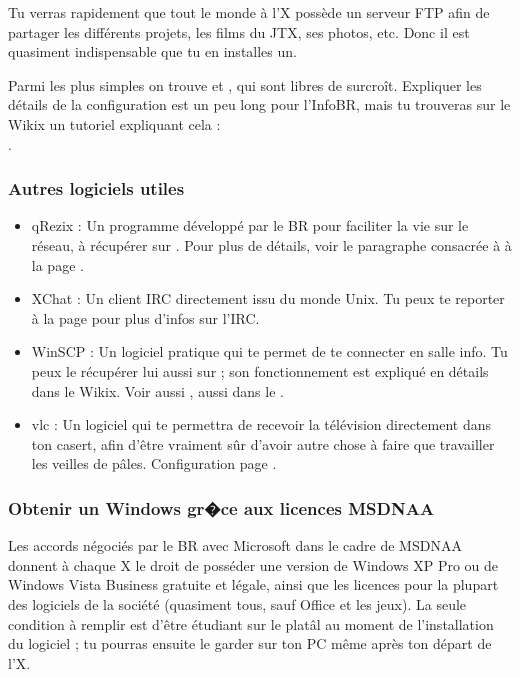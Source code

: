 Tu verras rapidement que tout le monde \`a l'X poss\`ede un serveur FTP
afin de partager les diff\'erents projets, les films du JTX, ses
photos, etc. Donc il est quasiment indispensable que tu en installes
un.

Parmi les plus simples on trouve  et , qui sont libres de surcro\^{i}t. Expliquer les d\'etails de la configuration est un peu long pour l'InfoBR, mais tu trouveras sur le Wikix un tutoriel expliquant cela : \\
.

\subsubsection{Autres logiciels utiles}

\begin{itemize}
  \item qRezix : Un programme d\'evelopp\'e par le BR pour faciliter la vie sur le r\'eseau,
                  \`a r\'ecup\'erer sur \xshare. Pour plus de d\'etails, voir le paragraphe consacr\'ee
                  \`a  \`a la page \pageref{qrezix}.
  \item XChat : Un client IRC directement issu du monde Unix.
                 Tu peux te reporter \`a la page \pageref{irc} pour plus d'infos sur l'IRC.
  \item WinSCP : Un logiciel pratique qui te permet de te connecter en salle info.
                  Tu peux le r\'ecup\'erer lui aussi sur \xshare ;
                  son fonctionnement est expliqu\'e en d\'etails dans le Wikix. Voir aussi , aussi dans le \xshare.
  \item vlc : Un logiciel qui te permettra de recevoir la t\'el\'evision directement dans ton casert, afin d'\^etre vraiment s\^{u}r d'avoir autre chose \`a faire que travailler les veilles de p\^ales. Configuration page \pageref{TV}.
\end{itemize}


\subsubsection{Obtenir un Windows gr�ce aux licences MSDNAA}

\label{msdnaa} Les accords n\'egoci\'es par le BR avec Microsoft dans le cadre de MSDNAA donnent \`a chaque X le droit de poss\'eder une version de Windows
XP Pro ou de Windows Vista Business gratuite et l\'egale, ainsi que les licences pour la plupart des logiciels de la soci\'et\'e (quasiment tous, sauf
Office et les jeux). La seule condition \`a remplir est d'\^etre \'etudiant sur le plat\^{a}l au moment de l'installation du logiciel ; tu pourras ensuite le
garder sur ton PC m\^eme apr\`es ton d\'epart de l'X.

